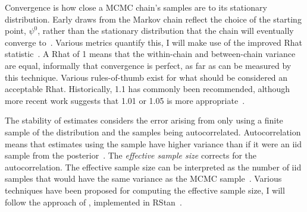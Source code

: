 \documentclass[thesis.tex]{subfiles}
\begin{document}
Convergence is how close a MCMC chain's samples are to its stationary distribution.
Early draws from the Markov chain reflect the choice of the starting point, $\psi^0$, rather than the stationary distribution that the chain will eventually converge to~\autocite[282]{gelmanBDA}.
Various metrics quantify this, I will make use of the improved Rhat statistic~\autocite{vehtariRhat}.
A Rhat of 1 means that the within-chain and between-chain variance are equal, informally that convergence is perfect, as far as can be measured by this technique.
Various rules-of-thumb exist for what should be considered an acceptable Rhat.
Historically, 1.1 has commonly been recommended, although more recent work suggests that 1.01 or 1.05 is more appropriate~\autocite{vehtariRhat}.

The stability of estimates considers the error arising from only using a finite sample of the distribution and the samples being autocorrelated.
Autocorrelation means that estimates using the sample have higher variance than if it were an iid sample from the posterior~\autocite[286]{gelmanBDA}.
The \emph{effective sample size} corrects for the autocorrelation.
The effective sample size can be interpreted as the number of iid samples that would have the same variance as the MCMC sample~\autocites[286]{gelmanBDA}{vehtariRhat}.
Various techniques have been proposed for computing the effective sample size, I will follow the approach of \textcite{vehtariRhat}, implemented in RStan~\autocite{RStan-2-32-3}.



\end{document}
